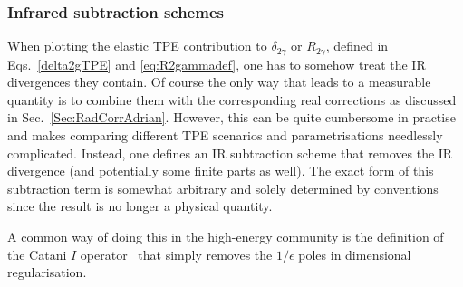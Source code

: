 \def\Re{{\rm Re}}
\subsubsection{Infrared subtraction schemes}

When plotting the elastic TPE contribution to $\delta_{2\gamma}$ or $R_{2\gamma}$, defined in Eqs.~\ref{delta2gTPE} and \ref{eq:R2gammadef}, one has to somehow treat the IR divergences they contain.
Of course the only way that leads to a measurable quantity is to combine them with the corresponding real corrections as discussed in Sec.~\ref{Sec:RadCorrAdrian}.
However, this can be quite cumbersome in practise and makes comparing different TPE scenarios and parametrisations needlessly complicated.
Instead, one defines an IR subtraction scheme that removes the IR divergence (and potentially some finite parts as well).
The exact form of this subtraction term is somewhat arbitrary and solely determined by conventions since the result is no longer a physical quantity.

A common way of doing this in the high-energy community is the definition of the Catani $I$ operator~\cite{Catani:1998bh} that simply removes the $1/\epsilon$ poles in dimensional regularisation.

